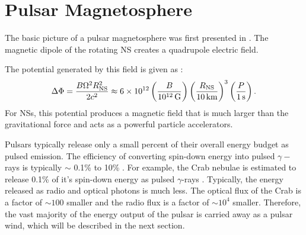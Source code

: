 \section{Pulsar Magnetosphere}

The basic picture of a pulsar magnetosphere was first presented in
\cite{goldreich_1969_pulsar-electrodynamics}.  The magnetic dipole of
the rotating \ac{NS} creates a quadrupole electric field.

The potential generated by this field is given as
\citep{goldreich_1969_pulsar-electrodynamics}:
\begin{equation}
  \Delta \Phi = \frac{B \Omega^2 R_\text{NS}^2}{2c^2}
  \approx 6\times 10^{12} 
  \left(\frac{B}{10^{12}\,\text{G}}\right)
  \left(\frac{R_\text{NS}}{10\,\text{km}}\right)^3
  \left(\frac{P}{1\,\text{s}}\right).
\end{equation}
For \acp{NS}, this potential produces a magnetic field that is much larger
than the gravitational force and acts as a powerful particle accelerators.

Pulsars typically release only a small percent of their overall
energy budget as pulsed emission. The efficiency of converting
spin-down energy into pulsed $\gamma-$rays is typically $\sim$
0.1\% to 10\% \citep{abdo_2010a_first-fermi}.  For example, the Crab
nebulae is estimated to release 0.1\% of it's spin-down energy as
pulsed $\gamma$-rays \citep{abdo_2010a_fermi-large}.  Typically,
the energy released as radio and optical photons is much less.
The optical flux of the Crab is a factor of $\sim100$ smaller
\citep{cocke_1969_discovery-optical} and the radio flux is a factor of
$\sim 10^4$ smaller.  Therefore, the vast majority of the energy output
of the pulsar is carried away as a pulsar wind, which will be described
in the next section.

